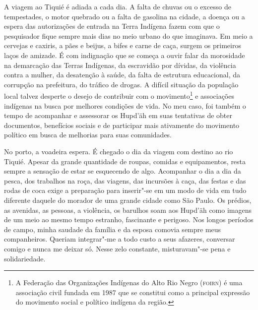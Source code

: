 

A viagem ao Tiquié é adiada a cada dia. A falta de chuvas ou o excesso
de tempestades, o motor quebrado ou a falta de gasolina na cidade, a
doença ou a espera das autorizações de entrada na Terra Indígena fazem
com que o pesquisador fique sempre mais dias no meio urbano do que
imaginava. Em meio a cervejas e caxiris, a pães e beijus, a bifes e
carne de caça, surgem os primeiros laços de amizade. É com indignação
que se começa a ouvir falar da morosidade na demarcação das Terras
Indígenas, da escravidão por dívidas, da violência contra a mulher, da
desatenção à saúde, da falta de estrutura educacional, da corrupção na
prefeitura, do tráfico de drogas. A difícil situação da população local
talvez desperte o desejo de contribuir com o movimento\footnote{A
  Federação das Organizações Indígenas do Alto Rio Negro ({\textsc{foirn}}) é uma
  associação civil fundada em 1987 que se constitui como a principal
  expressão do movimento social e político indígena da região.} e
associações indígenas na busca por melhores condições de vida. No meu
caso, foi também o tempo de acompanhar e assessorar os Hupd'äh em suas
tentativas de obter documentos, benefícios sociais e de participar mais
ativamente do movimento político em busca de melhorias para suas
comunidades.

No porto, a voadeira espera. É chegado o dia da viagem com destino ao
rio Tiquié. Apesar da grande quantidade de roupas, comidas e
equipamentos, resta sempre a sensação de estar se esquecendo de algo.
Acompanhar o dia a dia da pesca, dos trabalhos na roça, das viagens, das
incursões à caça, das festas e das rodas de coca exige a preparação para
inserir"-se em um modo de vida em tudo diferente daquele do morador de
uma grande cidade como São Paulo. Os prédios, as avenidas, as pessoas, a
violência, os barulhos soam aos Hupd'äh como imagens de um meio ao mesmo
tempo estranho, fascinante e perigoso. Nos longos períodos de campo,
minha saudade da família e da esposa comovia sempre meus companheiros.
Queriam integrar"-me a todo custo a seus afazeres, conversar comigo e
nunca me deixar só. Nesse zelo constante, misturavam"-se pena e
solidariedade.

